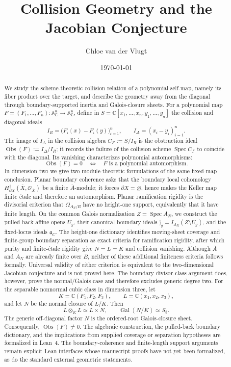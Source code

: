 \documentclass[11pt]{article}
\title{Collision Geometry and the Jacobian Conjecture}
\author{Chloe van der Vlugt}
\date{\today}
\theoremstyle{remark}
\theoremstyle{definition}
\DeclareMathOperator{\Spec}{Spec}
\DeclareMathOperator{\Gal}{Gal}
\newcommand{\A}{\mathbb A}
\newcommand{\C}{\mathbb C}
\newcommand{\Obs}{\operatorname{Obs}}
\begin{document}
\maketitle

\begin{abstract}
We study the scheme-theoretic collision relation of a polynomial self-map,
namely its fiber product over the target, and describe the geometry away
from the diagonal through boundary-supported inertia and Galois-closure
sheets.
For a polynomial map
\(F=(F_1,\dots,F_n)\colon\A^n_{\C}\to\A^n_{\C}\), define in
\(S=\C[x_1,\dots,x_n,y_1,\dots,y_n]\) the collision and diagonal ideals
\[
  I_R=\bigl(F_i(x)-F_i(y)\bigr)_{i=1}^n,
  \qquad
  I_\Delta=(x_i-y_i)_{i=1}^n.
\]
The image of \(I_\Delta\) in the collision algebra \(C_F:=S/I_R\) is the
obstruction ideal
\(\Obs(F):=I_\Delta/I_R\); it records the failure of the collision scheme
\(\Spec C_F\) to coincide with the diagonal.  Its vanishing characterizes
polynomial automorphisms:
\[
  \Obs(F)=0
  \quad\Longleftrightarrow\quad
  F\text{ is a polynomial automorphism}.
\]
In dimension two we give two module-theoretic formulations of the same
fixed-map conclusion.  Planar boundary coherence asks that the boundary
local cohomology
\(H^1_{\partial X}(\overline X,\mathcal O_{\overline X})\) be a finite
\(\overline A\)-module; it forces \(\partial X=\varnothing\), hence makes
the Keller map finite \'etale and therefore an automorphism.  Planar
ramification rigidity is the divisorial criterion that
\(\Omega_{A_N/B}\) have no height-one support, equivalently that it have
finite length.  On the common Galois normalization \(Z=\Spec A_N\), we
construct the pulled-back
affine opens \(U_g\), their canonical boundary ideals
\(\mathfrak j_g=I_{A_N}(Z\setminus U_g)\), and the fixed-locus ideals
\(\mathfrak a_C\).  The height-one dictionary identifies moving-sheet
coverage and finite-group boundary separation as exact criteria for
ramification rigidity, after which purity and finite-\'etale rigidity give
\(N=L=K\) and collision vanishing.  Although \(\overline A\) and \(A_N\)
are already finite over \(B\), neither of these additional finiteness
criteria follows formally.  Universal validity of either criterion is
equivalent to the two-dimensional Jacobian conjecture and is not proved
here.  The boundary divisor-class argument does, however, prove the
normal/Galois case and therefore excludes generic degree two.
For the separable nonnormal cubic class in dimension three, let
\[
  K=\C(F_1,F_2,F_3),
  \qquad
  L=\C(x_1,x_2,x_3),
\]
and let \(N\) be the normal closure of \(L/K\).  Then
\[
  L\otimes_K L\simeq L\times N,
  \qquad
  \Gal(N/K)\simeq S_3.
\]
The generic off-diagonal factor \(N\) is the ordered-root Galois-closure sheet.
Consequently, \(\Obs(F)\neq0\).  The algebraic construction, the
pulled-back boundary dictionary, and the implications from supplied
coverage or separation hypotheses are formalized in Lean~4.  The
boundary-coherence and finite-length support arguments remain explicit
Lean interfaces whose manuscript proofs have not yet been formalized, as
do the standard external geometric statements.
\end{abstract}
\end{document}
